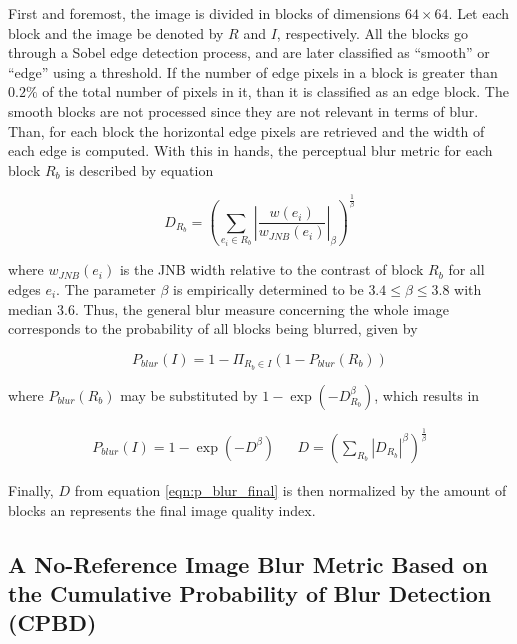 First and foremost, the image is divided in blocks of dimensions $64 \times 64$. Let each block and the image be denoted by $R$ and $I$, respectively. All the blocks go through a Sobel edge detection process, and are later classified as “smooth” or “edge” using a threshold. If the number of edge pixels in a block is greater than $0.2\%$ of the total number of pixels in it, than it is classified as an edge block. The smooth blocks are not processed since they are not relevant in terms of blur. Than, for each block the horizontal edge pixels are retrieved and the width of each edge is computed. With this in hands, the perceptual blur metric for each block $R_{b}$ is described by equation 

\begin{equation}
\label{eqn:perceptual_blur_metric}
D_{R_{b}} = \left(
\sum_{e_{i} \in R_{b}}
\left|
\frac{w(e_{i})}{w_{JNB}(e_{i})}
\right|_{\beta}
\right)^{\frac{1}{\beta}}
\end{equation}

\noindent where $w_{JNB}(e_{i})$ is the JNB width relative to the contrast of block $R_{b}$ for all edges $e_{i}$. The parameter $\beta$ is empirically determined to be $3.4 \leq \beta \leq 3.8$ with median $3.6$. Thus, the general blur measure concerning the whole image corresponds to the probability of all blocks being blurred, given by

\begin{equation}
\label{eqn:p_blur}
    P_{blur}(I) = 1 - \Pi_{R_{b} \in I}
    \left(
    1 - P_{blur}(R_{b})
    \right)
\end{equation}

\noindent where $P_{blur}(R_{b})$ may be substituted by $1 - \exp{\left(-D_{R_{b}}^{\beta} \right)}$, which results in

\begin{align}
\label{eqn:p_blur_final}
    P_{blur}(I) = 1 - \exp{\left(-D^{\beta}\right)}
&&
D = \left(
    \sum_{R_{b}}
    \left|D_{R_{b}}
    \right|^{\beta}
    \right)^{\frac{1}{\beta}}
\end{align}

\noindent Finally, $D$ from equation \ref{eqn:p_blur_final} is then normalized by the amount of blocks an represents the final image quality index.

\subsection{A No-Reference Image Blur Metric Based on the Cumulative Probability of Blur Detection (CPBD)}

